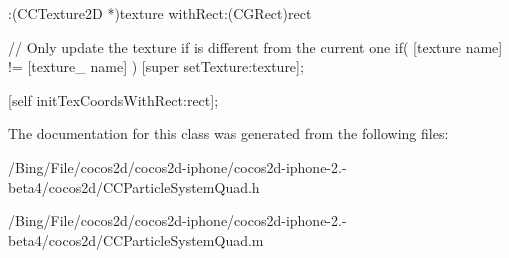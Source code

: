 \begin{DoxyCode}
                  :(CCTexture2D *)texture withRect:(CGRect)rect
{
        // Only update the texture if is different from the current one
        if( [texture name] != [texture_ name] )
                [super setTexture:texture];

        [self initTexCoordsWithRect:rect];
}
\end{DoxyCode}


The documentation for this class was generated from the following files\-:\begin{DoxyCompactItemize}
\item 
/\-Bing/\-File/cocos2d/cocos2d-\/iphone/cocos2d-\/iphone-\/2.-\/beta4/cocos2d/C\-C\-Particle\-System\-Quad.\-h\item 
/\-Bing/\-File/cocos2d/cocos2d-\/iphone/cocos2d-\/iphone-\/2.-\/beta4/cocos2d/C\-C\-Particle\-System\-Quad.\-m\end{DoxyCompactItemize}

